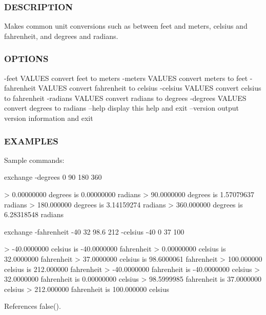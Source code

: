 \subsubsection*{D\+E\+S\+C\+R\+I\+P\+T\+I\+ON}

Makes common unit conversions such as between feet and meters, celsius and fahrenheit, and degrees and radians.

\subsubsection*{O\+P\+T\+I\+O\+NS}

-\/feet V\+A\+L\+U\+ES convert feet to meters -\/meters V\+A\+L\+U\+ES convert meters to feet -\/fahrenheit V\+A\+L\+U\+ES convert fahrenheit to celsius -\/celsius V\+A\+L\+U\+ES convert celsius to fahrenheit -\/radians V\+A\+L\+U\+ES convert radians to degrees -\/degrees V\+A\+L\+U\+ES convert degrees to radians --help display this help and exit --version output version information and exit

\subsubsection*{E\+X\+A\+M\+P\+L\+ES}

\begin{DoxyVerb} Sample commands:

  exchange -degrees 0 90 180 360

  > 0.00000000      degrees is    0.00000000      radians
  > 90.0000000      degrees is    1.57079637      radians
  > 180.000000      degrees is    3.14159274      radians
  > 360.000000      degrees is    6.28318548      radians

  exchange -fahrenheit -40 32 98.6 212 -celsius -40 0 37 100

  > -40.0000000      celsius is   -40.0000000      fahrenheit
  >  0.00000000      celsius is    32.0000000      fahrenheit
  >  37.0000000      celsius is    98.6000061      fahrenheit
  >  100.000000      celsius is    212.000000      fahrenheit
  > -40.0000000      fahrenheit is   -40.0000000      celsius
  >  32.0000000      fahrenheit is    0.00000000      celsius
  >  98.5999985      fahrenheit is    37.0000000      celsius
  >  212.000000      fahrenheit is    100.000000      celsius \end{DoxyVerb}
 

References false().

